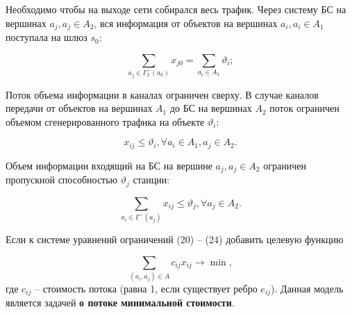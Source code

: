 \begin{frame}

    \fontsize{10pt}{5.2}\selectfont
    \justifying

    Необходимо чтобы на выходе сети собирался весь трафик. Через систему БС на вершинах $a_j, a_j \in A_2$, вся информация от объектов на вершинах $a_i, a_i \in A_1$ поступала  на шлюз $s_0$:

    \begin{equation}\label{eq:part2_1.3}
        \sum_{a_j \in \Gamma_2^-(a_0)} x_{j0} =  \sum_{a_i \in A_1} \vartheta_i;
    \end{equation}


    Поток объема информации в каналах ограничен сверху. В случае каналов передачи от объектов на вершинах $A_1$ до БС на вершинах $A_2$ поток ограничен объемом сгенерированного трафика на объекте $\vartheta_i$:


    \begin{equation}\label{eq:part2_1.4_1}
        x_{ij} \leqslant \vartheta_i, \forall a_i \in A_1, a_j \in A_2.
    \end{equation}

    Объем информации входящий на БС на вершине $a_j, a_j \in A_2$ ограничен пропускной способностью $\vartheta_j$ станции: 


    \begin{equation}\label{eq:part2_1.4_2}
        \sum_{a_i \in \Gamma^-(a_j)} x_{ij} \leqslant \vartheta_j, \forall a_j \in A_2.
    \end{equation}


    Если к системе уравнений ограничений (20) -- (24) добавить целевую функцию

    \begin{equation}
        \label{eq:part2_1.5}
        \sum_{(a_i, a_j) \in A} c_{ij} x_{ij} \rightarrow \min ,
    \end{equation}
    где $c_{ij}$ -- стоимость потока (равна 1, если существует ребро $e_{ij}$). 
    \medskip
    Данная модель является задачей \textbf{о потоке минимальной стоимости}. 

\end{frame}

